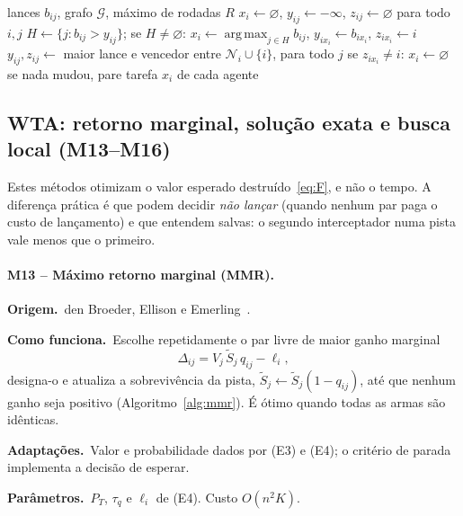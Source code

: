 \documentclass[11pt,a4paper]{article}
\newcommand{\orig}{\par\noindent\textbf{Origem.}~}
\newcommand{\func}{\par\noindent\textbf{Como funciona.}~}
\newcommand{\adap}{\par\noindent\textbf{Adaptações.}~}
\newcommand{\parm}{\par\noindent\textbf{Parâmetros.}~}
\DeclareMathOperator*{\argmax}{arg\,max}
\begin{document}
\begin{algorithm}[t]
\caption{CBAA: consenso sobre lances, uma tarefa por agente (M11, M12).}\label{alg:cbaa}
\begin{algorithmic}[1]
\Require lances $b_{ij}$, grafo $\mathcal{G}$, máximo de rodadas $R$
\State $x_i\gets\varnothing$, $y_{ij}\gets-\infty$, $z_{ij}\gets\varnothing$ para todo $i,j$
   
    \State $H\gets\{j: b_{ij}>y_{ij}\}$; se $H\neq\varnothing$: $x_i\gets\argmax_{j\in H}b_{ij}$, $y_{ix_i}\gets b_{ix_i}$, $z_{ix_i}\gets i$
  \EndFor
   
    \State $y_{ij},z_{ij}\gets$ maior lance e vencedor entre $\mathcal{N}_i\cup\{i\}$, para todo $j$
    \State se $z_{ix_i}\ne i$: $x_i\gets\varnothing$
  \EndFor
  \State se nada mudou, pare
\EndFor
\Ensure tarefa $x_i$ de cada agente
\end{algorithmic}
\end{algorithm}

\subsection{WTA: retorno marginal, solução exata e busca local (M13--M16)}

Estes métodos otimizam o valor esperado destruído~\eqref{eq:F}, e não o tempo. A diferença prática é que podem decidir
\emph{não lançar} (quando nenhum par paga o custo de lançamento) e que entendem salvas: o segundo interceptador numa
pista vale menos que o primeiro.

\paragraph{M13 -- Máximo retorno marginal (MMR).}
\orig den Broeder, Ellison e Emerling~\cite{denbroeder1959}.
\func Escolhe repetidamente o par livre de maior ganho marginal
\begin{equation}
  \Delta_{ij}=V_j\,\tilde S_j\,q_{ij}-\ell_i,
  \label{eq:mmr}
\end{equation}
designa-o e atualiza a sobrevivência da pista, $\tilde S_j\leftarrow\tilde S_j(1-q_{ij})$, até que nenhum ganho seja
positivo (Algoritmo~\ref{alg:mmr}). É ótimo quando todas as armas são idênticas.
\adap Valor e probabilidade dados por (E3) e (E4); o critério de parada implementa a decisão de esperar.
\parm $P_T$, $\tau_q$ e $\ell_i$ de (E4). Custo $O(n^2K)$.
\end{document}
